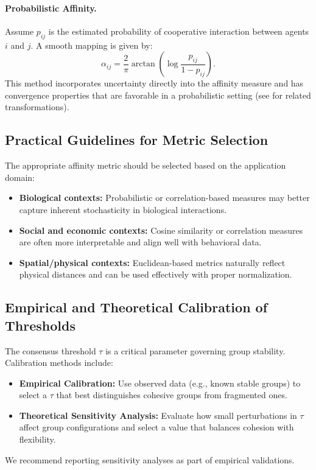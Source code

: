 \documentclass{article}
\begin{document}
\paragraph{Probabilistic Affinity.}
Assume $p_{ij}$ is the estimated probability of cooperative interaction between agents $i$ and $j$. A smooth mapping is given by:
\[
\alpha_{ij} = \frac{2}{\pi}\arctan\left(\log\frac{p_{ij}}{1-p_{ij}}\right).
\]
This method incorporates uncertainty directly into the affinity measure and has convergence properties that are favorable in a probabilistic setting (see \cite{bishop2006pattern} for related transformations).

\subsection{Practical Guidelines for Metric Selection}
The appropriate affinity metric should be selected based on the application domain:
\begin{itemize}
  \item \textbf{Biological contexts:} Probabilistic or correlation-based measures may better capture inherent stochasticity in biological interactions.
  \item \textbf{Social and economic contexts:} Cosine similarity or correlation measures are often more interpretable and align well with behavioral data.
  \item \textbf{Spatial/physical contexts:} Euclidean-based metrics naturally reflect physical distances and can be used effectively with proper normalization.
\end{itemize}

\subsection{Empirical and Theoretical Calibration of Thresholds}
The consensus threshold $\tau$ is a critical parameter governing group stability. Calibration methods include:
\begin{itemize}
  \item \textbf{Empirical Calibration:} Use observed data (e.g., known stable groups) to select a $\tau$ that best distinguishes cohesive groups from fragmented ones.
  \item \textbf{Theoretical Sensitivity Analysis:} Evaluate how small perturbations in $\tau$ affect group configurations and select a value that balances cohesion with flexibility.
\end{itemize}
We recommend reporting sensitivity analyses as part of empirical validations.
\end{document}
